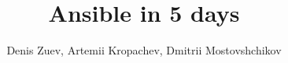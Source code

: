 \documentclass[12pt]{article}
\begin{document}
\setlength{\parindent}{2em}
\title{Ansible in 5 days}
\author{Denis Zuev, Artemii Kropachev, Dmitrii Mostovshchikov}
\maketitle





\end{document}
